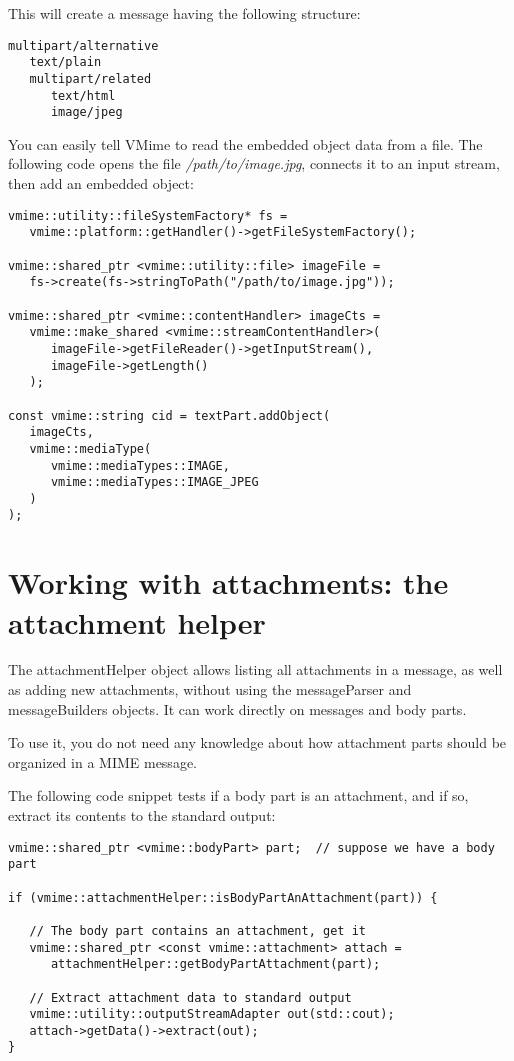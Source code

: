 This will create a message having the following structure:

\begin{verbatim}
multipart/alternative
   text/plain
   multipart/related
      text/html
      image/jpeg
\end{verbatim}

You can easily tell VMime to read the embedded object data from a file. The
following code opens the file \emph{/path/to/image.jpg}, connects it to an
input stream, then add an embedded object:

\begin{lstlisting}
vmime::utility::fileSystemFactory* fs =
   vmime::platform::getHandler()->getFileSystemFactory();

vmime::shared_ptr <vmime::utility::file> imageFile =
   fs->create(fs->stringToPath("/path/to/image.jpg"));

vmime::shared_ptr <vmime::contentHandler> imageCts =
   vmime::make_shared <vmime::streamContentHandler>(
      imageFile->getFileReader()->getInputStream(),
      imageFile->getLength()
   );

const vmime::string cid = textPart.addObject(
   imageCts,
   vmime::mediaType(
      vmime::mediaTypes::IMAGE,
      vmime::mediaTypes::IMAGE_JPEG
   )
);
\end{lstlisting}


\section{Working with attachments: the attachment helper}

The {\vcode attachmentHelper} object allows listing all attachments in a
message, as well as adding new attachments, without using the
{\vcode messageParser} and {\vcode messageBuilders} objects. It can work
directly on messages and body parts.

To use it, you do not need any knowledge about how attachment parts should
be organized in a MIME message.

The following code snippet tests if a body part is an attachment, and if so,
extract its contents to the standard output:

\begin{lstlisting}[caption={Testing if a body part is an attachment}]
vmime::shared_ptr <vmime::bodyPart> part;  // suppose we have a body part

if (vmime::attachmentHelper::isBodyPartAnAttachment(part)) {

   // The body part contains an attachment, get it
   vmime::shared_ptr <const vmime::attachment> attach =
      attachmentHelper::getBodyPartAttachment(part);

   // Extract attachment data to standard output
   vmime::utility::outputStreamAdapter out(std::cout);
   attach->getData()->extract(out);
}
\end{lstlisting}


